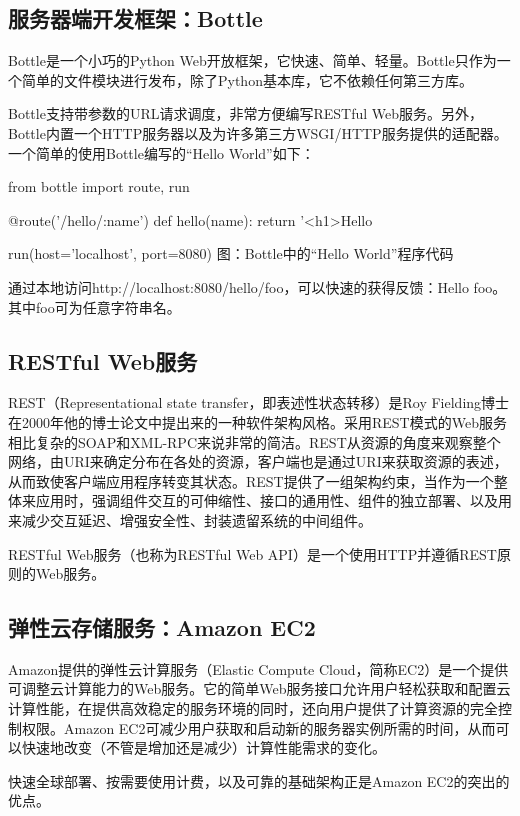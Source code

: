 \documentclass{article}
\begin{document}
\begin{CJK}{UTF8}{gbsn}
	\subsection{服务器端开发框架：Bottle}
  Bottle是一个小巧的Python Web开放框架，它快速、简单、轻量。Bottle只作为一个简单的文件模块进行发布，除了Python基本库，它不依赖任何第三方库。\cite{N01}

  Bottle支持带参数的URL请求调度，非常方便编写RESTful Web服务。另外，Bottle内置一个HTTP服务器以及为许多第三方WSGI/HTTP服务提供的适配器。一个简单的使用Bottle编写的“Hello World”如下：

  from bottle import route, run

  @route('/hello/:name')
  def hello(name):
      return '<h1>Hello %

  run(host='localhost', port=8080)
  图：Bottle中的“Hello World”程序代码

  通过本地访问http://localhost:8080/hello/foo，可以快速的获得反馈：Hello foo。其中foo可为任意字符串名。

	\subsection{RESTful Web服务}
  REST（Representational state transfer，即表述性状态转移）是Roy Fielding博士在2000年他的博士论文\cite{N02}中提出来的一种软件架构风格。采用REST模式的Web服务相比复杂的SOAP和XML-RPC来说非常的简洁。REST从资源的角度来观察整个网络，由URI来确定分布在各处的资源，客户端也是通过URI来获取资源的表述，从而致使客户端应用程序转变其状态。REST提供了一组架构约束，当作为一个整体来应用时，强调组件交互的可伸缩性、接口的通用性、组件的独立部署、以及用来减少交互延迟、增强安全性、封装遗留系统的中间组件。

  RESTful Web服务（也称为RESTful Web API）是一个使用HTTP并遵循REST原则的Web服务。

	\subsection{弹性云存储服务：Amazon EC2}
  Amazon提供的弹性云计算服务（Elastic Compute Cloud，简称EC2）是一个提供可调整云计算能力的Web服务。它的简单Web服务接口允许用户轻松获取和配置云计算性能，在提供高效稳定的服务环境的同时，还向用户提供了计算资源的完全控制权限。Amazon EC2可减少用户获取和启动新的服务器实例所需的时间，从而可以快速地改变（不管是增加还是减少）计算性能需求的变化。\cite{AWS}

  快速全球部署、按需要使用计费，以及可靠的基础架构正是Amazon EC2的突出的优点。


\end{CJK}
\end{document}
